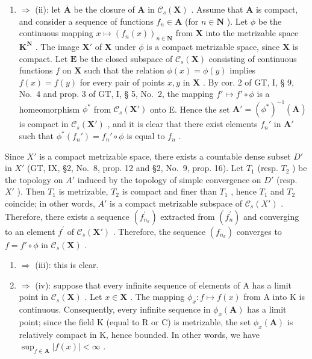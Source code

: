 \begin{enumerate}
\def\labelenumi{(\roman{enumi})}
\tightlist
\item
  \(\Rightarrow\) (ii): let \(\overline{\mathbf{A}}\) be the closure of \(\mathbf{A}\) in \(\mathcal{C}_s(\mathbf{X})\) . Assume that \(\mathbf{A}\) is compact, and consider a sequence of functions \(f_n \in \mathbf{A}\) (for \(n \in \mathbf{N}\) ). Let \(\phi\) be the continuous mapping \(x \mapsto (f_n(x))_{n \in \mathbf{N}}\) from \(\mathbf{X}\) into the metrizable space \(\mathbf{K}^{\mathbf{N}}\) . The image \(\mathbf{X}'\) of \(\mathbf{X}\) under \(\phi\) is a compact metrizable space, since \(\mathbf{X}\) is compact. Let \(\mathbf{E}\) be the closed subspace of \(\mathcal{C}_s(\mathbf{X})\) consisting of continuous functions \(f\) on \(\mathbf{X}\) such that the relation \(\phi(x) = \phi(y)\) implies \(f(x) = f(y)\) for every pair of points \(x, y\) in \(\mathbf{X}\) . By cor. 2 of GT, I, § 9, No.~4 and prop. 3 of GT, I, § 5, No.~2, the mapping \(f' \mapsto f' \circ \phi\) is a homeomorphism \(\phi^*\) from \(\mathcal{C}_s(\mathbf{X}')\) onto E. Hence the set \(\mathbf{A}' = (\phi^*)^{-1}(\overline{\mathbf{A}})\) is compact in \(\mathcal{C}_s(\mathbf{X}')\) , and it is clear that there exist elements \(f_n'\) in \(\mathbf{A}'\) such that \(\phi^*(f_n') = f_n' \circ \phi\) is equal to \(f_n\) .
\end{enumerate}

Since \(X'\) is a compact metrizable space, there exists a countable dense subset \(D'\) in \(X'\) (GT, IX, §2, No.~8, prop. 12 and §2, No.~9, prop. 16). Let \(T_{1}\) (resp. \(T_{2}\) ) be the topology on \(A'\) induced by the topology of simple convergence on \(D'\) (resp. \(X'\) ). Then \(T_{1}\) is metrizable, \(T_{2}\) is compact and finer than \(T_{1}\) , hence \(T_{1}\) and \(T_{2}\) coincide; in other words, \(A'\) is a compact metrizable subspace of \(\mathcal{C}_{s}(X')\) . Therefore, there exists a sequence \((f_{n_k}^{\prime})\) extracted from \((f_n^{\prime})\) and converging to an element \(f^{\prime}\) of \(\mathcal{C}_s(\mathbf{X}')\) . Therefore, the sequence \((f_{n_k})\) converges to \(f = f' \circ \phi\) in \(\mathcal{C}_s(\mathbf{X})\) .

\begin{enumerate}
\def\labelenumi{(\roman{enumi})}
\setcounter{enumi}{1}
\item
  \(\Rightarrow\) (iii): this is clear.
\item
  \(\Rightarrow\) (iv): suppose that every infinite sequence of elements of A has a limit point in \(\mathcal{C}_s(\mathbf{X})\) . Let \(x \in \mathbf{X}\) . The mapping \(\phi_x: f \mapsto f(x)\) from A into K is continuous. Consequently, every infinite sequence in \(\phi_x(\mathbf{A})\) has a limit point; since the field K (equal to R or C) is metrizable, the set \(\phi_x(\mathbf{A})\) is relatively compact in K, hence bounded. In other words, we have \(\sup_{f \in \mathbf{A}} |f(x)| < \infty\) .
\end{enumerate}

